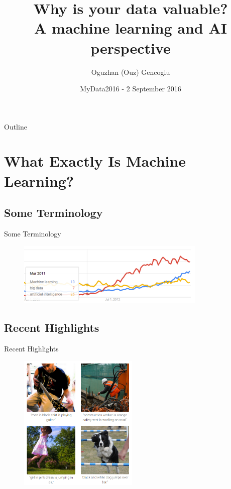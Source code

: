 \documentclass{beamer}
\title{Why is your data valuable? \\ A machine learning and AI perspective}
\author{Oguzhan (Ouz) Gencoglu}
\institute[TUT] %
{
  Tampere University of Technology
}
\date{MyData2016 - 2 September 2016}
\begin{document}

\begin{frame}
	\titlepage
\end{frame}

\begin{frame}{Outline}
	\tableofcontents
\end{frame}

\section{What Exactly Is Machine Learning?}
\subsection{Some Terminology}

\begin{frame}{Some Terminology}
		\begin{figure}
	  		\vspace*{0.1cm}
			\centering
			\includegraphics[trim = 0mm 0mm 0mm 0mm, clip, width=9.0cm]{gtrends.png}
			\label{fig:res4}
		\end{figure}
\end{frame}

\subsection{Recent Highlights}
\begin{frame}{Recent Highlights}
		\begin{figure}
	  		\vspace*{0.0cm}
			\centering
			\includegraphics[trim = 0mm 0mm 0mm 0mm, clip, width=5.7cm]{visualdesc.PNG}
			\label{fig:res4}
		\end{figure}
\end{frame}
\end{document}
